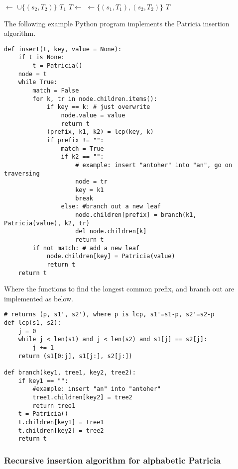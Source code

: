\documentclass{article}
\begin{document}
\begin{algorithmic}[1]
    \State {} $\gets$  $\cup \{(s_2, T_2)\}$
    \State \Return $T_1$
  \EndIf
  \State $T \gets$ 
  \State {} $\gets \{(s_1, T_1), (s_2, T_2)\}$
  \State \Return $T$
\EndFunction
\end{algorithmic}

The following example Python program implements the Patricia insertion algorithm.

\lstset{language=Python}
\begin{lstlisting}
def insert(t, key, value = None):
    if t is None:
        t = Patricia()
    node = t
    while True:
        match = False
        for k, tr in node.children.items():
            if key == k: # just overwrite
                node.value = value
                return t
            (prefix, k1, k2) = lcp(key, k)
            if prefix != "":
                match = True
                if k2 == "":
                    # example: insert "antoher" into "an", go on traversing
                    node = tr
                    key = k1
                    break
                else: #branch out a new leaf
                    node.children[prefix] = branch(k1, Patricia(value), k2, tr)
                    del node.children[k]
                    return t
        if not match: # add a new leaf
            node.children[key] = Patricia(value)
            return t
    return t
\end{lstlisting}

Where the functions to find the longest common prefix, and branch out are
implemented as below.

\begin{lstlisting}
# returns (p, s1', s2'), where p is lcp, s1'=s1-p, s2'=s2-p
def lcp(s1, s2):
    j = 0
    while j < len(s1) and j < len(s2) and s1[j] == s2[j]:
        j += 1
    return (s1[0:j], s1[j:], s2[j:])

def branch(key1, tree1, key2, tree2):
    if key1 == "":
        #example: insert "an" into "antoher"
        tree1.children[key2] = tree2
        return tree1
    t = Patricia()
    t.children[key1] = tree1
    t.children[key2] = tree2
    return t
\end{lstlisting}

\subsubsection{Recursive insertion algorithm for alphabetic Patricia}
\end{document}
